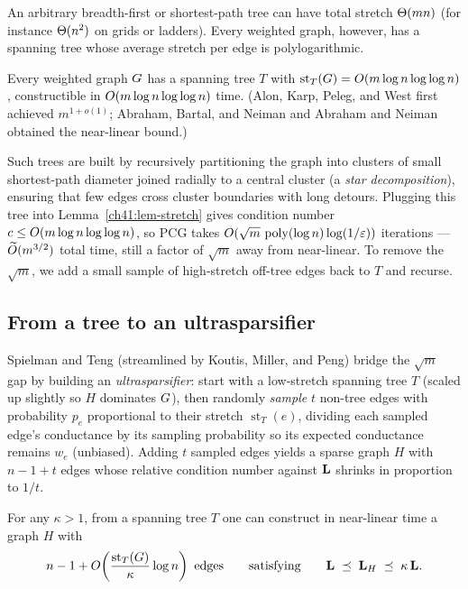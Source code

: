 An arbitrary breadth-first or shortest-path tree can have total stretch $\Theta(mn)$ (for instance $\Theta(n^2)$ on grids or ladders). Every weighted graph, however, has a spanning tree whose average stretch per edge is polylogarithmic.

\begin{theorem}\label{ch41:thm-lsst}
Every weighted graph $G$ has a spanning tree $T$ with $\operatorname{st}_T(G)=O(m\log n\log\log n)$, constructible in $O(m\log n\log\log n)$ time. (Alon, Karp, Peleg, and West first achieved $m^{1+o(1)}$; Abraham, Bartal, and Neiman and Abraham and Neiman obtained the near-linear bound.)
\end{theorem}

Such trees are built by recursively partitioning the graph into clusters of small shortest-path diameter joined radially to a central cluster (a \emph{star decomposition}), ensuring that few edges cross cluster boundaries with long detours. Plugging this tree into Lemma~\ref{ch41:lem-stretch} gives condition number $c \le O(m\log n\log\log n)$, so PCG takes $O(\sqrt{m}\,\operatorname{poly}(\log n)\log(1/\varepsilon))$ iterations --- $\widetilde{O}(m^{3/2})$ total time, still a factor of $\sqrt{m}$ away from near-linear. To remove the $\sqrt{m}$, we add a small sample of high-stretch off-tree edges back to $T$ and recurse.

\subsection{From a tree to an ultrasparsifier}\label{ch41:ultra}

Spielman and Teng (streamlined by Koutis, Miller, and Peng) bridge the $\sqrt{m}$ gap by building an \emph{ultrasparsifier}: start with a low-stretch spanning tree $T$ (scaled up slightly so $H$ dominates $G$), then randomly \emph{sample} $t$ non-tree edges with probability $p_e$ proportional to their stretch $\operatorname{st}_T(e)$, dividing each sampled edge's conductance by its sampling probability so its expected conductance remains $w_e$ (unbiased). Adding $t$ sampled edges yields a sparse graph $H$ with $n - 1 + t$ edges whose relative condition number against $\mathbf{L}$ shrinks in proportion to $1/t$.

\begin{theorem}[Ultrasparsifier]\label{ch41:thm-ultra}
For any $\kappa > 1$, from a spanning tree $T$ one can construct in near-linear time a graph $H$ with
\[
  n - 1 + O\!\left(\frac{\operatorname{st}_T(G)}{\kappa}\log n\right) \text{ edges}
  \qquad\text{satisfying}\qquad
  \mathbf{L} \;\preceq\; \mathbf{L}_H \;\preceq\; \kappa\,\mathbf{L} .
\]
\end{theorem}

